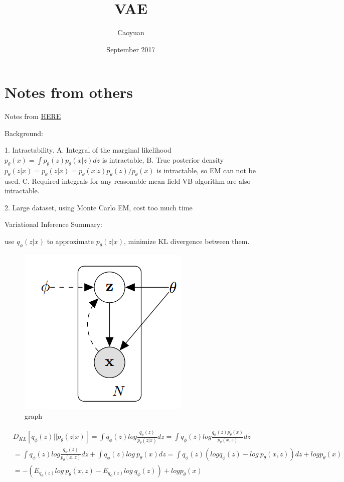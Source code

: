 \documentclass{article}
\title{VAE}
\author{Caoyuan}
\date{September 2017}
\begin{document}


\maketitle
\section{Notes from others}
Notes from \href{https://zhuanlan.zhihu.com/p/27197322}{HERE}


Background: 


1. Intractability. A. Integral of the marginal likelihood $p_{\theta}(x) = \int p_\theta(z)p_\theta(x|z)dz$ is intractable, B. True posterior density $p_{\theta}(z|x)=p_\theta(z|x) =p_\theta(x|z)p_\theta(z)/p_\theta(x)$ is intractable, so EM can not be used. C. Required integrals for any reasonable mean-field VB algorithm are also intractable.


2. Large dataset, using Monte Carlo EM, cost too much time


Variational Inference Summary:


use $q_\phi(z|x)$ to approximate $p_\theta(z|x)$, minimize KL divergence between them.
\begin{figure}
\centering
\includegraphics[width = .5\textwidth]{vae.png}
\caption{graph}
\label{fig:model}
\end{figure}

\begin{equation}
\begin{split}
&D_{KL}[q_{\phi}(z)||p_\theta(z|x)] = \int q_\phi (z)log\frac{q_\phi (z)}{p_\theta(z|x)}dz = \int q_\phi (z)log\frac{q_\phi (z) p_\theta(x)}{p_\theta(x,z)}dz\\
&=\int q_\phi(z)log \frac{q_\phi (z)}{p_\theta(x,z)}dz + \int q_\phi(z)log\ p_\theta(x)dz=\int q_\phi (z)(logq_\phi (z) - log\ p_\theta(x,z))dz + logp_\theta(x)\\
&=-(E_{q_{\phi}(z)}log\ p_\theta(x,z) - E_{q_{\phi}(z)}log\ q_\phi(z))+ logp_\theta(x)\\
\end{split}
\end{equation}
\end{document}
